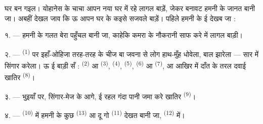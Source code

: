 %

\VUsaut{6.0mm}
\VUsaut{1.4mm}
\VUsaut{0.4mm}
\VUsaut{2.2mm}

घर बन गइल। योहानेस के चाचा आपन नया घर में रहे लागल बाड़ें, जेकर बनावट
हमनी के जानत बानी जा। अबहीं देखल जाव कि ऊ आपन घर के कइसे सजवले बाड़ें।
पहिले हमनी के ई देखब जा :

\VUsaut{3.0mm}

१. --- हमनी के गलत बेरा पहुँचल बानी जा, काहेकि कमरा के नौकरानी
 साफ करे में लागल बाड़ी।

२. ---  \textsuperscript{(1)} पर इहाँ-ओहिजा तरह-तरह
के चीज बा जवना से लोग हाथ-मुँह धोवेला, बाल झारेला — सार में सिंगार
करेला। ऊ ई बाड़ी सँ :  \textsuperscript{(2)} आ
 \textsuperscript{(3)}, 
\textsuperscript{(4)},  \textsuperscript{(5)},
 \textsuperscript{(6)} आ  \textsuperscript{(7)},
आ आखिर में दाँत के तरल दवाई खातिर  \textsuperscript{(8)}।

३. --- भुइयाँ पर, सिंगार-मेज के आगे, ई रहल गंदा पानी जमा करे खातिर
 \textsuperscript{(9)}।

४. ---  \textsuperscript{(10)} में हमनी के कुछ
 \textsuperscript{(13)} आ दू गो 
\textsuperscript{(11)} देखत बानी जा, 
\textsuperscript{(12)} में।

